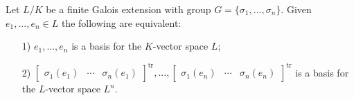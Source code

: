 \begin{lemma} \label{Lemma 4, Feb 20}
	Let $L/K$ be a finite Galois extension with group $G = \{\sigma_1, ..., \sigma_n\}$. Given $e_1, ..., e_n \in L$ the following are equivalent:
	\begin{enumerate}
		\item[1)] $e_1, ..., e_n$ is a basis for the $K$-vector space $L$;
		\item[2)] $\begin{bmatrix} \sigma_1(e_1) & \cdots & \sigma_n(e_1) \end{bmatrix}^{\text{tr}}, ..., \begin{bmatrix} \sigma_1(e_n) & \cdots & \sigma_n(e_n) \end{bmatrix}^{\text{tr}}$ is a basis for the $L$-vector space $L^n$.
	\end{enumerate}
\end{lemma}

